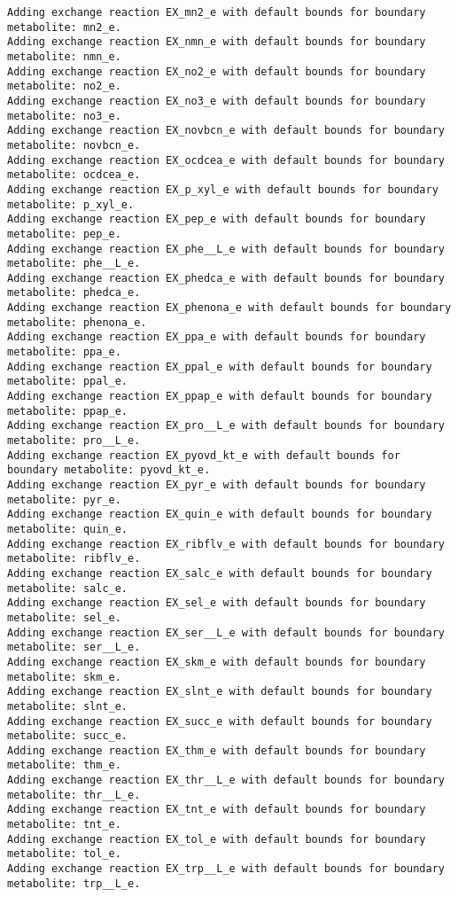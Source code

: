 \documentclass[
  letterpaper,
  DIV=11,
  numbers=noendperiod]{scrartcl}
\begin{document}
\begin{verbatim}
Adding exchange reaction EX_mn2_e with default bounds for boundary metabolite: mn2_e.
Adding exchange reaction EX_nmn_e with default bounds for boundary metabolite: nmn_e.
Adding exchange reaction EX_no2_e with default bounds for boundary metabolite: no2_e.
Adding exchange reaction EX_no3_e with default bounds for boundary metabolite: no3_e.
Adding exchange reaction EX_novbcn_e with default bounds for boundary metabolite: novbcn_e.
Adding exchange reaction EX_ocdcea_e with default bounds for boundary metabolite: ocdcea_e.
Adding exchange reaction EX_p_xyl_e with default bounds for boundary metabolite: p_xyl_e.
Adding exchange reaction EX_pep_e with default bounds for boundary metabolite: pep_e.
Adding exchange reaction EX_phe__L_e with default bounds for boundary metabolite: phe__L_e.
Adding exchange reaction EX_phedca_e with default bounds for boundary metabolite: phedca_e.
Adding exchange reaction EX_phenona_e with default bounds for boundary metabolite: phenona_e.
Adding exchange reaction EX_ppa_e with default bounds for boundary metabolite: ppa_e.
Adding exchange reaction EX_ppal_e with default bounds for boundary metabolite: ppal_e.
Adding exchange reaction EX_ppap_e with default bounds for boundary metabolite: ppap_e.
Adding exchange reaction EX_pro__L_e with default bounds for boundary metabolite: pro__L_e.
Adding exchange reaction EX_pyovd_kt_e with default bounds for boundary metabolite: pyovd_kt_e.
Adding exchange reaction EX_pyr_e with default bounds for boundary metabolite: pyr_e.
Adding exchange reaction EX_quin_e with default bounds for boundary metabolite: quin_e.
Adding exchange reaction EX_ribflv_e with default bounds for boundary metabolite: ribflv_e.
Adding exchange reaction EX_salc_e with default bounds for boundary metabolite: salc_e.
Adding exchange reaction EX_sel_e with default bounds for boundary metabolite: sel_e.
Adding exchange reaction EX_ser__L_e with default bounds for boundary metabolite: ser__L_e.
Adding exchange reaction EX_skm_e with default bounds for boundary metabolite: skm_e.
Adding exchange reaction EX_slnt_e with default bounds for boundary metabolite: slnt_e.
Adding exchange reaction EX_succ_e with default bounds for boundary metabolite: succ_e.
Adding exchange reaction EX_thm_e with default bounds for boundary metabolite: thm_e.
Adding exchange reaction EX_thr__L_e with default bounds for boundary metabolite: thr__L_e.
Adding exchange reaction EX_tnt_e with default bounds for boundary metabolite: tnt_e.
Adding exchange reaction EX_tol_e with default bounds for boundary metabolite: tol_e.
Adding exchange reaction EX_trp__L_e with default bounds for boundary metabolite: trp__L_e.

\end{verbatim}
\end{document}

